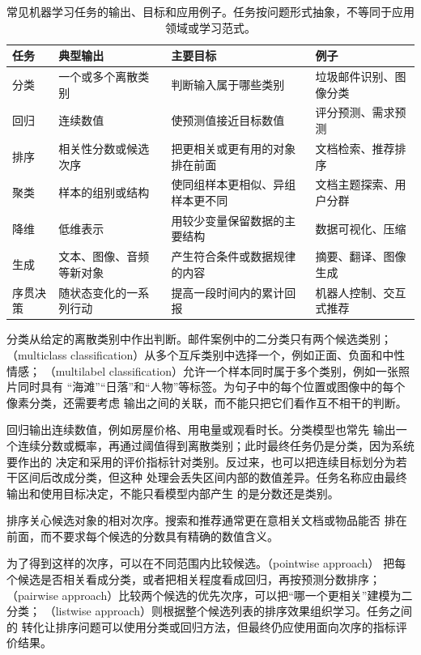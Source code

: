 \begin{table}[t]
  \centering
  \small
  \begin{tabularx}{\linewidth}{@{}lXXX@{}}
    \toprule
    \textbf{任务} & \textbf{典型输出} & \textbf{主要目标} & \textbf{例子} \\
    \midrule
    分类 & 一个或多个离散类别 & 判断输入属于哪些类别 & 垃圾邮件识别、图像分类 \\
    回归 & 连续数值 & 使预测值接近目标数值 & 评分预测、需求预测 \\
    排序 & 相关性分数或候选次序 & 把更相关或更有用的对象排在前面 & 文档检索、推荐排序 \\
    聚类 & 样本的组别或结构 & 使同组样本更相似、异组样本更不同 & 文档主题探索、用户分群 \\
    降维 & 低维表示 & 用较少变量保留数据的主要结构 & 数据可视化、压缩 \\
    生成 & 文本、图像、音频等新对象 & 产生符合条件或数据规律的内容 & 摘要、翻译、图像生成 \\
    序贯决策 & 随状态变化的一系列行动 & 提高一段时间内的累计回报 & 机器人控制、交互式推荐 \\
    \bottomrule
  \end{tabularx}
  \caption{常见机器学习任务的输出、目标和应用例子。任务按问题形式抽象，不等同于应用领域或学习范式。}
  \label{tab:common-ml-tasks}
\end{table}

分类从给定的离散类别中作出判断。邮件案例中的二分类只有两个候选类别；（multiclass
classification）从多个互斥类别中选择一个，例如正面、负面和中性情感；
（multilabel classification）允许一个样本同时属于多个类别，例如一张照片同时具有
“海滩”“日落”和“人物”等标签。为句子中的每个位置或图像中的每个像素分类，还需要考虑
输出之间的关联，而不能只把它们看作互不相干的判断。

回归输出连续数值，例如房屋价格、用电量或观看时长。分类模型也常先
输出一个连续分数或概率，再通过阈值得到离散类别；此时最终任务仍是分类，因为系统要作出的
决定和采用的评价指标针对类别。反过来，也可以把连续目标划分为若干区间后改成分类，但这种
处理会丢失区间内部的数值差异。任务名称应由最终输出和使用目标决定，不能只看模型内部产生
的是分数还是类别。

排序关心候选对象的相对次序。搜索和推荐通常更在意相关文档或物品能否
排在前面，而不要求每个候选的分数具有精确的数值含义。

为了得到这样的次序，可以在不同范围内比较候选。（pointwise approach）
把每个候选是否相关看成分类，或者把相关程度看成回归，再按预测分数排序；
（pairwise approach）比较两个候选的优先次序，可以把“哪一个更相关”建模为二分类；
（listwise approach）则根据整个候选列表的排序效果组织学习。任务之间的
转化让排序问题可以使用分类或回归方法，但最终仍应使用面向次序的指标评价结果。

